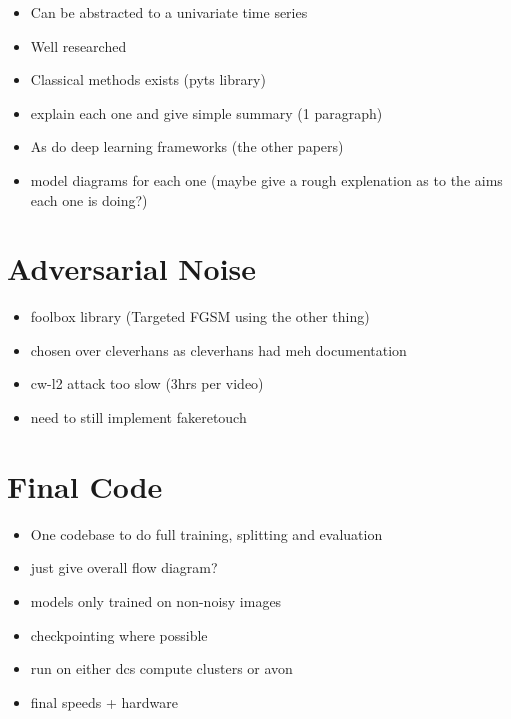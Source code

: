 \begin{itemize}
    \item Can be abstracted to a univariate time series
    \item Well researched
    \item Classical methods exists (pyts library)
    \item explain each one and give simple summary (1 paragraph)
    \item As do deep learning frameworks (the other papers)
    \item model diagrams for each one (maybe give a rough explenation as to the aims each one is doing?)
\end{itemize}

\section{Adversarial Noise}

\begin{itemize}
    \item foolbox library (Targeted FGSM using the other thing)
    \item chosen over cleverhans as cleverhans had meh documentation
    \item cw-l2 attack too slow (3hrs per video)
    \item need to still implement fakeretouch
\end{itemize}

\section{Final Code}

\begin{itemize}
    \item One codebase to do full training, splitting and evaluation
    \item just give overall flow diagram?
    \item {\huge models only trained on non-noisy images}
    \item checkpointing where possible
    \item run on either dcs compute clusters or avon
    \item final speeds + hardware
\end{itemize}